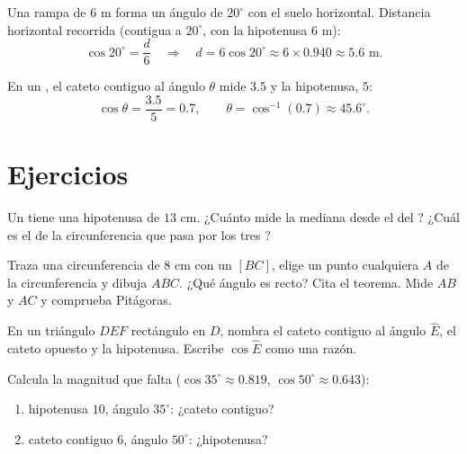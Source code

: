\begin{example}\label{ex:g8:cosine:side}
Una rampa de $6$ m forma un ángulo de $20^\circ$ con el suelo horizontal.
Distancia horizontal recorrida (contigua a $20^\circ$, con la hipotenusa
$6$ m):
\[
\cos 20^\circ = \frac{d}{6}
\quad\Longrightarrow\quad
d = 6 \cos 20^\circ \approx 6 \times 0.940 \approx 5.6 \text{ m}.
\]
\end{example}

\begin{example}\label{ex:g8:cosine:angle}
En un , el cateto contiguo al ángulo $\theta$ mide
$3.5$ y la hipotenusa, $5$:
\[
\cos\theta = \frac{3.5}{5} = 0.7,
\qquad
\theta = \cos^{-1}(0.7) \approx 45.6^\circ .
\]
\end{example}

\section{Ejercicios}

\begin{exercise}[$\star$]\label{exo:g8:cosine:1}
Un  tiene una hipotenusa de $13$ cm. ¿Cuánto mide
la mediana desde el  del ? ¿Cuál es el  de la
circunferencia que pasa por los tres ?
\end{exercise}

\begin{exercise}[$\star$]\label{exo:g8:cosine:2}
Traza una circunferencia de  $8$ cm con un  $[BC]$, elige un
punto cualquiera $A$ de la circunferencia y dibuja $ABC$. ¿Qué ángulo es recto? Cita
el teorema. Mide $AB$ y $AC$ y comprueba Pitágoras.
\end{exercise}

\begin{exercise}[$\star$]\label{exo:g8:cosine:3}
En un triángulo $DEF$ rectángulo en $D$, nombra el cateto contiguo
al ángulo $\widehat E$, el cateto opuesto y la hipotenusa.
Escribe $\cos \widehat E$ como una razón.
\end{exercise}

\begin{exercise}[$\star$]\label{exo:g8:cosine:4}
Calcula la magnitud que falta ($\cos 35^\circ \approx 0.819$,
$\cos 50^\circ \approx 0.643$):
\begin{enumerate}
  \item hipotenusa $10$, ángulo $35^\circ$: ¿cateto contiguo?
  \item cateto contiguo $6$, ángulo $50^\circ$: ¿hipotenusa?
\end{enumerate}
\end{exercise}

